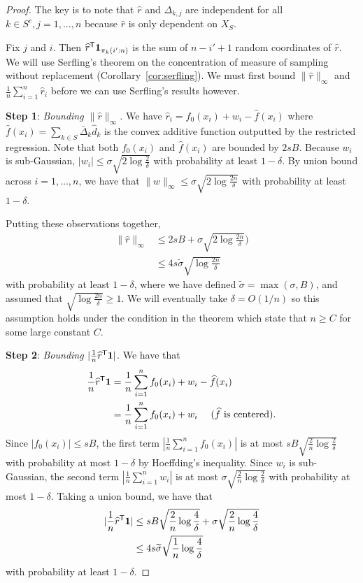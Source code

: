\begin{proof}
The key is to note that $\hat{r}$ and $\Delta_{k,j}$ are independent for all $k \in S^c,j=1,...,n$ because $\hat{r}$ is only dependent on $X_{S}$.

Fix $j$ and $i$. Then $\widehat{r}^{\mathsf{T}} \mbox{\boldmath $1$}_{\pi_k(i':n)}$ is the sum
of $n-i'+1$ random coordinates of $\hat{r}$. We will use
Serfling's theorem on the concentration of measure of sampling without
replacement (Corollary~\ref{cor:serfling}). We must first bound $\|
\hat{r} \|_\infty$ and $\frac{1}{n} \sum_{i=1}^n \hat{r}_i$ before we
can use Serfling's results however.

\vskip5pt
\textbf{Step 1}: {\it Bounding $\| \hat{r} \|_\infty$.} We have $\hat{r}_i = f_0(x_i) + w_i - \hat{f}(x_i)$ where
$\hat{f}(x_i) = \sum_{k \in S} \bar{\Delta}_k \hat{d}_k$ is the convex
additive function outputted by the restricted regression. Note that
both $f_0(x_i)$ and $\hat{f}(x_i)$ are bounded by $2sB$. 
Because $w_i$ is sub-Gaussian, $|w_i| \leq  \sigma \sqrt{2\log \frac{2}{\delta}}$ with probability at least $1-\delta$. By union bound across $i=1,...,n$, we have that $\| w\|_\infty \leq \sigma \sqrt{ 2 \log \frac{2n}{\delta}}$ with probability at least $1 - \delta$.

Putting these observations together,
\begin{align}
\| \hat{r} \|_\infty &\leq 2sB + \sigma \sqrt{ 2\log \frac{2n}{\delta}}) \nonumber \\
      &\leq 4 s \tilde{\sigma} \sqrt{\log \frac{2n}{\delta}} \label{eqn:stepone_rhat}
\end{align}
with probability at least $1 - \delta$, where we have defined
$\tilde{\sigma} = \max(\sigma, B)$,
and assumed that $\sqrt{\log \frac{2n}{\delta}} \geq 1$. We will eventually take $\delta = O(1/n)$ so this assumption holds under the condition in the theorem which state that $n \geq C$ for some large constant $C$.

\vskip5pt
\textbf{Step 2}: {\it Bounding $| \frac{1}{n} \widehat{r}^{\mathsf{T}} \mbox{\boldmath $1$}
  |$.}  We have that 
\begin{align*}
\frac{1}{n} \widehat{r}^{\mathsf{T}} \mbox{\boldmath $1$} &= 
    \frac{1}{n} \sum_{i=1}^n f_0(x_i) + w_i - \widehat{f}(x_i) \\
  &= \frac{1}{n} \sum_{i=1}^n f_0(x_i) + w_i \quad \textrm{ ($\widehat{f}$ is centered)}.
\end{align*}
Since $|f_0(x_i)| \leq sB$, the first term $| \frac{1}{n} \sum_{i=1}^n
f_0(x_i)|$ is at most $sB \sqrt{\frac{2}{n} \log \frac{2}{\delta}}$
with probability at most $1-\delta$ by Hoeffding's inequality. Since
$w_i$ is sub-Gaussian, the second term $|\frac{1}{n} \sum_{i=1}^n
w_i|$ is at most $\sigma \sqrt{ \frac{2}{n} \log \frac{2}{\delta}}$
with probability at most $1-\delta$.  
Taking a union bound, we have that 
\begin{align}
| \frac{1}{n} \widehat{r}^{\mathsf{T}} \mbox{\boldmath $1$}| &\leq sB \sqrt{\frac{2}{n} \log \frac{4}{\delta}} +  \sigma \sqrt{\frac{2}{n} \log \frac{4}{\delta}} \nonumber \\
  &\leq 4 s \widetilde{\sigma} \sqrt{\frac{1}{n} \log \frac{4}{\delta}} \label{eqn:steptwo_rhat}
\end{align}
with probability at least $1-\delta$.


\end{proof}
